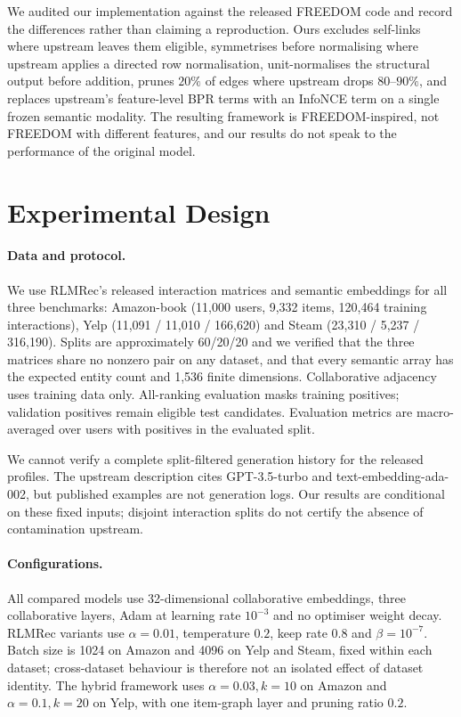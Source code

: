 \documentclass[runningheads]{llncs}
\begin{document}
We audited our implementation against the released FREEDOM code and record the
differences rather than claiming a reproduction. Ours excludes self-links where
upstream leaves them eligible, symmetrises before normalising where upstream applies a
directed row normalisation, unit-normalises the structural output before
addition, prunes $20\%$ of edges where upstream drops $80$--$90\%$, and replaces
upstream's feature-level BPR terms with an InfoNCE term on a single frozen
semantic modality. The resulting framework is FREEDOM-inspired, not
FREEDOM with different features, and our results do not speak to the performance
of the original model.

\section{Experimental Design}
\paragraph{Data and protocol.}
We use RLMRec's released interaction matrices and semantic embeddings for all
three benchmarks: Amazon-book (11,000 users, 9,332 items, 120,464 training
interactions), Yelp (11,091 / 11,010 / 166,620) and Steam (23,310 / 5,237 /
316,190). Splits are approximately 60/20/20 and we verified that the three
matrices share no nonzero pair on any dataset, and that every semantic array has
the expected entity count and 1,536 finite dimensions. Collaborative adjacency
uses training data only. All-ranking evaluation masks training positives;
validation positives remain eligible test candidates. Evaluation
metrics are macro-averaged over users with positives in the evaluated split.

We cannot verify a complete split-filtered generation history for the released
profiles. The upstream description cites GPT-3.5-turbo and text-embedding-ada-002,
but published examples are not generation logs. Our results are conditional on
these fixed inputs; disjoint interaction splits do not certify the absence of
contamination upstream.

\paragraph{Configurations.}
All compared models use 32-dimensional collaborative embeddings, three
collaborative layers, Adam at learning rate $10^{-3}$ and no optimiser weight
decay. RLMRec variants use $\alpha=0.01$, temperature $0.2$, keep rate $0.8$ and
$\beta=10^{-7}$. Batch size is 1024 on Amazon and 4096 on Yelp and Steam, fixed
within each dataset; cross-dataset behaviour is therefore not an isolated effect
of dataset identity. The hybrid framework uses $\alpha=0.03,k=10$ on Amazon and
$\alpha=0.1,k=20$ on Yelp, with one item-graph layer and pruning ratio $0.2$.
\end{document}
